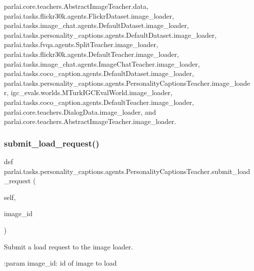 parlai.\+core.\+teachers.\+Abstract\+Image\+Teacher.\+data, parlai.\+tasks.\+flickr30k.\+agents.\+Flickr\+Dataset.\+image\+\_\+loader, parlai.\+tasks.\+image\+\_\+chat.\+agents.\+Default\+Dataset.\+image\+\_\+loader, parlai.\+tasks.\+personality\+\_\+captions.\+agents.\+Default\+Dataset.\+image\+\_\+loader, parlai.\+tasks.\+fvqa.\+agents.\+Split\+Teacher.\+image\+\_\+loader, parlai.\+tasks.\+flickr30k.\+agents.\+Default\+Teacher.\+image\+\_\+loader, parlai.\+tasks.\+image\+\_\+chat.\+agents.\+Image\+Chat\+Teacher.\+image\+\_\+loader, parlai.\+tasks.\+coco\+\_\+caption.\+agents.\+Default\+Dataset.\+image\+\_\+loader, parlai.\+tasks.\+personality\+\_\+captions.\+agents.\+Personality\+Captions\+Teacher.\+image\+\_\+loader, igc\+\_\+evals.\+worlds.\+M\+Turk\+I\+G\+C\+Eval\+World.\+image\+\_\+loader, parlai.\+tasks.\+coco\+\_\+caption.\+agents.\+Default\+Teacher.\+image\+\_\+loader, parlai.\+core.\+teachers.\+Dialog\+Data.\+image\+\_\+loader, and parlai.\+core.\+teachers.\+Abstract\+Image\+Teacher.\+image\+\_\+loader.

\mbox{\label{classparlai_1_1tasks_1_1personality__captions_1_1agents_1_1PersonalityCaptionsTeacher_a8b15a0281c0e15c0f4af16da820f7a52}} 
\subsubsection{\texorpdfstring{submit\+\_\+load\+\_\+request()}{submit\_load\_request()}}
{\footnotesize\ttfamily def parlai.\+tasks.\+personality\+\_\+captions.\+agents.\+Personality\+Captions\+Teacher.\+submit\+\_\+load\+\_\+request (\begin{DoxyParamCaption}\item[{}]{self,  }\item[{}]{image\+\_\+id }\end{DoxyParamCaption})}

\begin{DoxyVerb}Submit a load request to the image loader.

:param image_id:
    id of image to load
\end{DoxyVerb}
 

